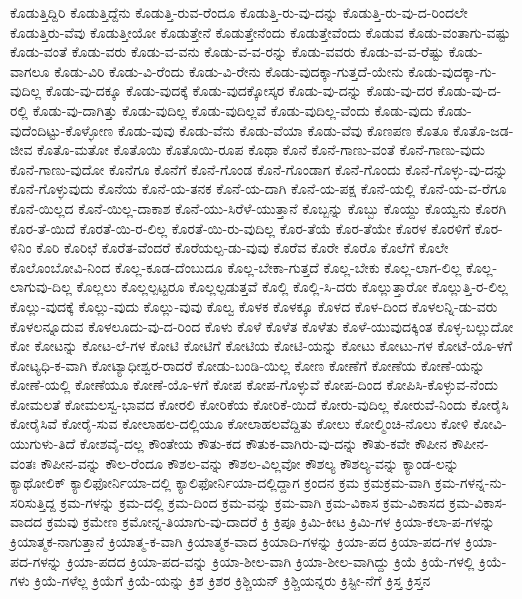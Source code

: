 {ಕೊಡುತ್ತಿದ್ದಿರಿ
ಕೊಡುತ್ತಿದ್ದೆನು
ಕೊಡುತ್ತಿ-ರುವ-ರೆಂದೂ
ಕೊಡುತ್ತಿ-ರು-ವು-ದನ್ನು
ಕೊಡುತ್ತಿ-ರು-ವು-ದ-ರಿಂದಲೇ
ಕೊಡುತ್ತಿರು-ವೆವು
ಕೊಡುತ್ತೀಯೋ
ಕೊಡುತ್ತೇನೆ
ಕೊಡುತ್ತೇನೆಂದು
ಕೊಡುತ್ತೇವೆಂದು
ಕೊಡುವ
ಕೊಡು-ವಂತಾಗು-ವಷ್ಟು
ಕೊಡು-ವಂತೆ
ಕೊಡು-ವರು
ಕೊಡು-ವ-ವನು
ಕೊಡು-ವ-ವ-ರನ್ನು
ಕೊಡು-ವವರು
ಕೊಡು-ವ-ವ-ರೆಷ್ಟು
ಕೊಡು-ವಾಗಲೂ
ಕೊಡು-ವಿರಿ
ಕೊಡು-ವಿ-ರೆಂದು
ಕೊಡು-ವಿ-ರೇನು
ಕೊಡು-ವುದಕ್ಕಾ-ಗುತ್ತದೆ-ಯೇನು
ಕೊಡು-ವುದಕ್ಕಾ-ಗು-ವುದಿಲ್ಲ
ಕೊಡು-ವು-ದಕ್ಕೂ
ಕೊಡು-ವುದಕ್ಕೆ
ಕೊಡು-ವುದಕ್ಕೋಸ್ಕರ
ಕೊಡು-ವು-ದನ್ನು
ಕೊಡು-ವು-ದರ
ಕೊಡು-ವು-ದ-ರಲ್ಲಿ
ಕೊಡು-ವು-ದಾಗಿತ್ತು
ಕೊಡು-ವುದಿಲ್ಲ
ಕೊಡು-ವುದಿಲ್ಲವೆ
ಕೊಡು-ವುದಿಲ್ಲ-ವೆಂದು
ಕೊಡು-ವುದು
ಕೊಡು-ವುದೆಂದಿಟ್ಟು-ಕೊಳ್ಳೋಣ
ಕೊಡು-ವುವು
ಕೊಡು-ವೆನು
ಕೊಡು-ವೆಯಾ
ಕೊಡು-ವೆವು
ಕೊಣಪಣ
ಕೊತೂ
ಕೊತೊ-ಜಡ-ಜೀವ
ಕೊತೊ-ಮತೋ
ಕೊತೊಯಿ
ಕೊತೊಯಿ-ರೂಪ
ಕೊಥಾ
ಕೊನೆ
ಕೊನೆ-ಗಾಣು-ವಂತೆ
ಕೊನೆ-ಗಾಣು-ವುದು
ಕೊನೆ-ಗಾಣು-ವುದೋ
ಕೊನೆಗೂ
ಕೊನೆಗೆ
ಕೊನೆ-ಗೊಂಡ
ಕೊನೆ-ಗೊಂಡಾಗ
ಕೊನೆ-ಗೊಂದು
ಕೊನೆ-ಗೊಳ್ಳು-ವು-ದನ್ನು
ಕೊನೆ-ಗೊಳ್ಳುವುದು
ಕೊನೆಯ
ಕೊನೆ-ಯ-ತನಕ
ಕೊನೆ-ಯ-ದಾಗಿ
ಕೊನೆ-ಯ-ಪಕ್ಷ
ಕೊನೆ-ಯಲ್ಲಿ
ಕೊನೆ-ಯ-ವ-ರೆಗೂ
ಕೊನೆ-ಯಿಲ್ಲದ
ಕೊನೆ-ಯಿಲ್ಲ-ದಾಕಾಶ
ಕೊನೆ-ಯು-ಸಿರೆಳೆ-ಯುತ್ತಾನೆ
ಕೊಬ್ಬನ್ನು
ಕೊಬ್ಬು
ಕೊಯ್ದು
ಕೊಯ್ವನು
ಕೊರಗಿ
ಕೊರ-ತೆ-ಯಿದೆ
ಕೊರತೆ-ಯಿ-ರ-ಲಿಲ್ಲ
ಕೊರತೆ-ಯಿ-ರು-ವುದಿಲ್ಲ
ಕೊರ-ತೆಯೆ
ಕೊರ-ತೆಯೇ
ಕೊರಳ
ಕೊರಳಿಗೆ
ಕೊರ-ಳಿನಿಂ
ಕೊರಿ
ಕೊರಿಛೆ
ಕೊರೆತ-ವೆಂದರೆ
ಕೊರೆಯಲ್ಪ-ಡು-ವುವು
ಕೊರೆವ
ಕೊರೇ
ಕೊರೊ
ಕೊಲೆಗೆ
ಕೊಲೇ
ಕೊಲೊಂಬೋವಿ-ನಿಂದ
ಕೊಲ್ಲ-ಕೂಡ-ದೆಂಬುದೂ
ಕೊಲ್ಲ-ಬೇಕಾ-ಗುತ್ತದೆ
ಕೊಲ್ಲ-ಬೇಕು
ಕೊಲ್ಲ-ಲಾಗ-ಲಿಲ್ಲ
ಕೊಲ್ಲ-ಲಾಗುವು-ದಿಲ್ಲ
ಕೊಲ್ಲಲು
ಕೊಲ್ಲಲ್ಪಟ್ಟರೂ
ಕೊಲ್ಲಲ್ಪಡುತ್ತವೆ
ಕೊಲ್ಲಿ
ಕೊಲ್ಲಿ-ಸಿ-ದರು
ಕೊಲ್ಲುತ್ತಾರೋ
ಕೊಲ್ಲುತ್ತಿ-ರ-ಲಿಲ್ಲ
ಕೊಲ್ಲು-ವುದಕ್ಕೆ
ಕೊಲ್ಲು-ವುದು
ಕೊಲ್ಲು-ವುವು
ಕೊಲ್ವ
ಕೊಳಕ
ಕೊಳಕ್ಕೂ
ಕೊಳದ
ಕೊಳ-ದಿಂದ
ಕೊಳಲನ್ನಿ-ಡು-ವರು
ಕೊಳಲನ್ನೂದುವ
ಕೊಳಲೂದು-ವು-ದ-ರಿಂದ
ಕೊಳು
ಕೊಳೆ
ಕೊಳೆತ
ಕೊಳೆತು
ಕೊಳೆ-ಯುವುದಕ್ಕಿಂತ
ಕೊಳ್ಳ-ಬಲ್ಲುದೋ
ಕೋ
ಕೋಟನ್ನು
ಕೋಟ-ಲೆ-ಗಳ
ಕೋಟಿ
ಕೋಟಿಗೆ
ಕೋಟಿಯ
ಕೋಟಿ-ಯನ್ನು
ಕೋಟು
ಕೋಟು-ಗಳ
ಕೋಟೆ-ಯೊ-ಳಗೆ
ಕೋಟ್ಯಧಿ-ಕ-ವಾಗಿ
ಕೋಟ್ಯಾಧೀಶ್ವರ-ರಾದರೆ
ಕೋಡು-ಬಂಡಿ-ಯಿಲ್ಲ
ಕೋಣ
ಕೋಣೆಗೆ
ಕೋಣೆಯ
ಕೋಣೆ-ಯನ್ನು
ಕೋಣೆ-ಯಲ್ಲಿ
ಕೋಣೆಯೂ
ಕೋಣೆ-ಯೊ-ಳಗೆ
ಕೋಪ
ಕೋಪ-ಗೊಳ್ಳುವೆ
ಕೋಪ-ದಿಂದ
ಕೋಪಿಸಿ-ಕೊಳ್ಳುವ-ನೆಂದು
ಕೋಮಲತೆ
ಕೋಮಲಸ್ವ-ಭಾವದ
ಕೋರಲಿ
ಕೋರಿಕೆಯ
ಕೋರಿಕೆ-ಯಿದೆ
ಕೋರು-ವುದಿಲ್ಲ
ಕೋರುವೆ-ನಿಂದು
ಕೋರೈಸಿ
ಕೋರೈಸಿವೆ
ಕೋರೈ-ಸುವ
ಕೋಲಾಹಲ-ದಲ್ಲಿಯೂ
ಕೋಲಾಹಲವೆದ್ದಿತು
ಕೋಲು
ಕೋಲ್ಮಿಂಚಿ-ನೊಲು
ಕೋಳಿ
ಕೋವಿ-ಯುಗುಳು-ತಿದೆ
ಕೋಶವೈ-ದಲ್ಲ
ಕೌಂತೇಯ
ಕೌತು-ಕದ
ಕೌತುಕ-ವಾಗಿರು-ವು-ದನ್ನು
ಕೌತು-ಕವೇ
ಕೌಪೀನ
ಕೌಪೀನ-ವಂತಃ
ಕೌಪೀನ-ವನ್ನು
ಕೌಲ-ರೆಂದೂ
ಕೌಶಲ-ವನ್ನು
ಕೌಶಲ-ವಿಲ್ಲವೋ
ಕೌಶಲ್ಯ
ಕೌಶಲ್ಯ-ವನ್ನು
ಕ್ಯಾಂಡ-ಲನ್ನು
ಕ್ಯಾಥೋಲಿಕ್
ಕ್ಯಾಲಿಫೋರ್ನಿಯಾ-ದಲ್ಲಿ
ಕ್ಯಾಲಿಫೋರ್ನಿಯಾ-ದಲ್ಲಿದ್ದಾಗ
ಕ್ರಂದನ
ಕ್ರಮ
ಕ್ರಮಕ್ರಮ-ವಾಗಿ
ಕ್ರಮ-ಗಳನ್ನ-ನು-ಸರಿಸುತ್ತಿದ್ದ
ಕ್ರಮ-ಗಳನ್ನು
ಕ್ರಮ-ದಲ್ಲಿ
ಕ್ರಮ-ದಿಂದ
ಕ್ರಮ-ವನ್ನು
ಕ್ರಮ-ವಾಗಿ
ಕ್ರಮ-ವಿಕಾಸ
ಕ್ರಮ-ವಿಕಾಸದ
ಕ್ರಮ-ವಿಕಾಸ-ವಾದದ
ಕ್ರಮವು
ಕ್ರಮೇಣ
ಕ್ರಮೋನ್ನ-ತಿಯಾಗು-ವು-ದಾದರೆ
ಕ್ರಿ
ಕ್ರಿಪೂ
ಕ್ರಿಮಿ-ಕೀಟ
ಕ್ರಿಮಿ-ಗಳ
ಕ್ರಿಯಾ-ಕಲಾ-ಪ-ಗಳನ್ನು
ಕ್ರಿಯಾತ್ಮಕ-ನಾಗುತ್ತಾನೆ
ಕ್ರಿಯಾತ್ಮ-ಕ-ವಾಗಿ
ಕ್ರಿಯಾತ್ಮಕ-ವಾದ
ಕ್ರಿಯಾದಿ-ಗಳನ್ನು
ಕ್ರಿಯಾ-ಪದ
ಕ್ರಿಯಾ-ಪದ-ಗಳ
ಕ್ರಿಯಾ-ಪದ-ಗಳನ್ನು
ಕ್ರಿಯಾ-ಪದದ
ಕ್ರಿಯಾ-ಪದ-ವನ್ನು
ಕ್ರಿಯಾ-ಶೀಲ-ವಾಗಿ
ಕ್ರಿಯಾ-ಶೀಲ-ವಾಗಿದ್ದು
ಕ್ರಿಯೆ
ಕ್ರಿಯೆ-ಗಳಲ್ಲಿ
ಕ್ರಿಯೆ-ಗಳು
ಕ್ರಿಯೆ-ಗಳೆಲ್ಲ
ಕ್ರಿಯೆಗೆ
ಕ್ರಿಯೆ-ಯನ್ನು
ಕ್ರಿಶ
ಕ್ರಿಶರ
ಕ್ರಿಶ್ಚಿಯನ್
ಕ್ರಿಶ್ಚಿಯನ್ನರು
ಕ್ರಿಸ್ಟೀ-ನೆಗೆ
ಕ್ರಿಸ್ತ
ಕ್ರಿಸ್ತನ
}
